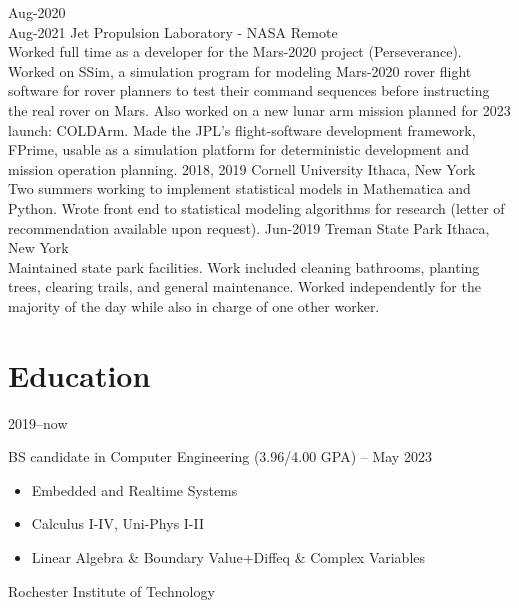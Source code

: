 \documentclass[print]{cv-style}          %
\begin{document}
\begin{entrylist}
\entry
  {Aug-2020\\Aug-2021}
  {Jet Propulsion Laboratory - NASA}
  {Remote}
  {\\
  Worked full time as a developer for the Mars-2020 project (Perseverance). Worked on SSim, a simulation program for modeling Mars-2020 rover flight software for rover planners to test their command sequences before instructing the real rover on Mars. Also worked on a new lunar arm mission planned for 2023 launch: COLDArm. Made the JPL's flight-software development framework, FPrime, usable as a simulation platform for deterministic development and mission operation planning.
  }
\entry
  {2018, 2019}
  {Cornell University}
  {Ithaca, New York}
  {\\
  Two summers working to implement statistical models in Mathematica and Python. Wrote front end to statistical modeling algorithms for research (letter of recommendation available upon request).}
  \entry
  {Jun-2019}
  {Treman State Park}
  {Ithaca, New York}
  {\\
Maintained state park facilities. Work included cleaning bathrooms, planting trees, clearing trails, and general maintenance. Worked independently for the majority of the day while also in charge of one other worker.}


\end{entrylist}


\section{Education}

\begin{entrylist}
{\vspace{-0.3cm}}
\entry
{2019--now}
{BS candidate {\normalfont in Computer Engineering (3.96/4.00 GPA) -- May 2023} \\
\begin{itemize}%
	\item Embedded and Realtime Systems
	\item Calculus I-IV, Uni-Phys I-II
	\item Linear Algebra \& Boundary Value+Diffeq \& Complex Variables
\end{itemize}
}
{Rochester Institute of Technology}
{\vspace{-0.3cm}}

\end{entrylist}
\end{document}
